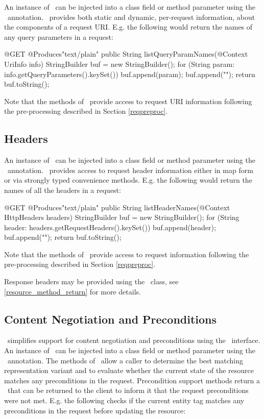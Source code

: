 An instance of \UriInfo\ can be injected into a class field or method parameter using the \Context\ annotation. \UriInfo\ provides both static and dynamic, per-request information, about the components of a request URI. E.g. the following would return the names of any query parameters in a request:

\begin{listing}{1}
@GET
@Produces{"text/plain"}
public String listQueryParamNames(@Context UriInfo info) {
  StringBuilder buf = new StringBuilder();
  for (String param: info.getQueryParameters().keySet()) {
    buf.append(param);
    buf.append("\n");
  }
  return buf.toString();
}
\end{listing}

Note that the methods of \UriInfo\ provide access to request URI information following the pre-processing described in Section \ref{reqpreproc}.

\subsection{Headers}
\label{httpheaders}

An instance of \HttpHeaders\ can be injected into a class field or method parameter using the \Context\ annotation. \HttpHeaders\ provides access to request header information either in map form or via strongly typed convenience methods. E.g. the following would return the names of all the headers in a request:

\begin{listing}{1}
@GET
@Produces{"text/plain"}
public String listHeaderNames(@Context HttpHeaders headers) {
  StringBuilder buf = new StringBuilder();
  for (String header: headers.getRequestHeaders().keySet()) {
    buf.append(header);
    buf.append("\n");
  }
  return buf.toString();
}
\end{listing}

Note that the methods of \HttpHeaders\ provide access to request information following the pre-processing described in Section \ref{reqpreproc}.

Response headers may be provided using the \Response\ class, see \ref{resource_method_return} for more details.

\subsection{Content Negotiation and Preconditions}
\label{conneg_and_preconditions}

\jaxrs\ simplifies support for content negotiation and preconditions using the \Request\ interface. An instance of \Request\ can be injected into a class field or method parameter using the \Context\ annotation. The methods of \Request\ allow a caller to determine the best matching representation variant and to evaluate whether the current state of the resource matches any preconditions in the request. Precondition support methods return a \ResponseBuilder\ that can be returned to the client to inform it that the request preconditions were not met. E.g. the following checks if the current entity tag matches any preconditions in the request before updating the resource:

